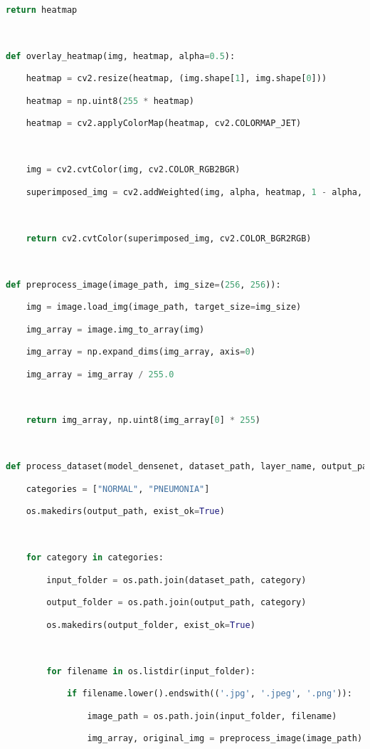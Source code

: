 \documentclass{article}
\begin{document}
\begin{lstlisting}[style=mystyle,language=Python]
    return heatmap



def overlay_heatmap(img, heatmap, alpha=0.5):

    heatmap = cv2.resize(heatmap, (img.shape[1], img.shape[0]))

    heatmap = np.uint8(255 * heatmap)

    heatmap = cv2.applyColorMap(heatmap, cv2.COLORMAP_JET)



    img = cv2.cvtColor(img, cv2.COLOR_RGB2BGR)

    superimposed_img = cv2.addWeighted(img, alpha, heatmap, 1 - alpha, 0)



    return cv2.cvtColor(superimposed_img, cv2.COLOR_BGR2RGB)



def preprocess_image(image_path, img_size=(256, 256)):

    img = image.load_img(image_path, target_size=img_size)

    img_array = image.img_to_array(img)

    img_array = np.expand_dims(img_array, axis=0)

    img_array = img_array / 255.0



    return img_array, np.uint8(img_array[0] * 255)



def process_dataset(model_densenet, dataset_path, layer_name, output_path):

    categories = ["NORMAL", "PNEUMONIA"]

    os.makedirs(output_path, exist_ok=True)



    for category in categories:

        input_folder = os.path.join(dataset_path, category)

        output_folder = os.path.join(output_path, category)

        os.makedirs(output_folder, exist_ok=True)



        for filename in os.listdir(input_folder):

            if filename.lower().endswith(('.jpg', '.jpeg', '.png')):

                image_path = os.path.join(input_folder, filename)

                img_array, original_img = preprocess_image(image_path)




\end{lstlisting}
\end{document}
